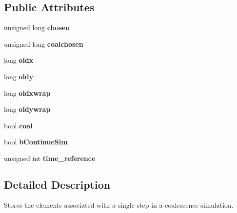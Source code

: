 \subsection*{Public Attributes}
\begin{DoxyCompactItemize}
\item 
unsigned long {\bfseries chosen}\hypertarget{struct_step_a03a0984250a050752ff20129ff457510}{}\label{struct_step_a03a0984250a050752ff20129ff457510}

\item 
unsigned long {\bfseries coalchosen}\hypertarget{struct_step_a5824c6f227fbe3aa249f6067bae0aab2}{}\label{struct_step_a5824c6f227fbe3aa249f6067bae0aab2}

\item 
long {\bfseries oldx}\hypertarget{struct_step_a79f782f87fe4df1f7df10bc6b102530a}{}\label{struct_step_a79f782f87fe4df1f7df10bc6b102530a}

\item 
long {\bfseries oldy}\hypertarget{struct_step_afde730c847c774e13f96c36a2a87a818}{}\label{struct_step_afde730c847c774e13f96c36a2a87a818}

\item 
long {\bfseries oldxwrap}\hypertarget{struct_step_ad627fdb344ea1b6e143bf81794955f9a}{}\label{struct_step_ad627fdb344ea1b6e143bf81794955f9a}

\item 
long {\bfseries oldywrap}\hypertarget{struct_step_ae18da2822c5603f935b02454c1c8f9f3}{}\label{struct_step_ae18da2822c5603f935b02454c1c8f9f3}

\item 
bool {\bfseries coal}\hypertarget{struct_step_a20362fa305c240b197cab6934b4b5087}{}\label{struct_step_a20362fa305c240b197cab6934b4b5087}

\item 
bool {\bfseries b\+Continue\+Sim}\hypertarget{struct_step_a38035eb27c4eb998e5303905356a2cab}{}\label{struct_step_a38035eb27c4eb998e5303905356a2cab}

\item 
unsigned int {\bfseries time\+\_\+reference}\hypertarget{struct_step_a2ad070594a57205ace161c8e910e06b4}{}\label{struct_step_a2ad070594a57205ace161c8e910e06b4}

\end{DoxyCompactItemize}


\subsection{Detailed Description}
Stores the elements associated with a single step in a coalescence simulation. 

